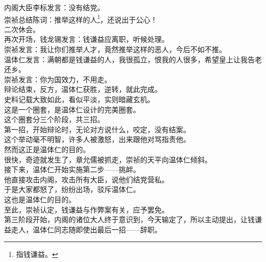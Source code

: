 \begin{multicols}{\theparacolNo}
内阁大臣李标发言：没有结党。\\

崇祯总结陈词：推举这样的人\footnote{指钱谦益。}，还说出于公心！\\

二次休会。\\

再次开场，钱龙锡发言：钱谦益应离职，听候处理。\\

崇祯发言：我让你们推举人才，竟然推举这样的恶人，今后不如不推。\\

温体仁发言：满朝都是钱谦益的人，我很孤立，恨我的人很多，希望皇上让我告老还乡。\\

崇祯发言：你为国效力，不用走。\\

辩论结束，反方，温体仁获胜，逆转，就此完成。\\

史料记载大致如此，看似平淡，实则暗藏玄机。\\

这是一个圈套，是温体仁设计的完美圈套。\\

这个圈套分三个阶段，共三招。\\

第一招，开始辩论时，无论对方说什么，咬定，没有结案。\\

这个举动毫不明智，许多人被激怒，出来跟他对骂指责他。\\

然而这正是温体仁的目的。\\

很快，奇迹就发生了，章允儒被抓走，崇祯的天平向温体仁倾斜。\\

接下来，温体仁开始实施第二步——挑衅。\\

他直接攻击内阁，攻击所有大臣，说他们结党营私。\\

于是大家都怒了，纷纷出场，驳斥温体仁。\\

这也是温体仁的目的。\\

至此，崇祯认定，钱谦益与作弊案有关，应予罢免。\\

第三阶段开始，内阁的诸位大人终于意识到，今天输定了，所以主动提出，让钱谦益走人，温体仁同志随即使出最后一招——辞职。\\


\end{multicols}
